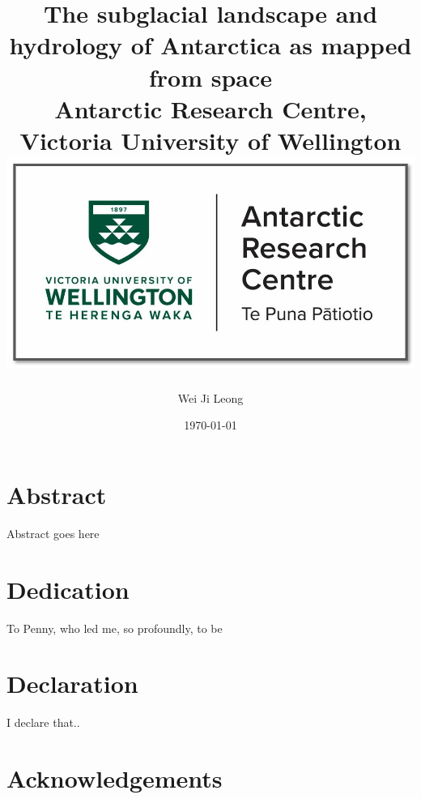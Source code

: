 \documentclass[12pt,twoside]{book}
\title{
{The subglacial landscape and hydrology of Antarctica as mapped from space}\\
{\large Antarctic Research Centre, Victoria University of Wellington}\\
{\includegraphics[scale=0.5]{0_arc_logo.jpg}}
}
\author{Wei Ji Leong}
\date{\today}
\begin{document}


\chapter*{Abstract}
Abstract goes here

\chapter*{Dedication}
To Penny, who led me, so profoundly, to be

\chapter*{Declaration}
I declare that..

\chapter*{Acknowledgements}
\end{document}
